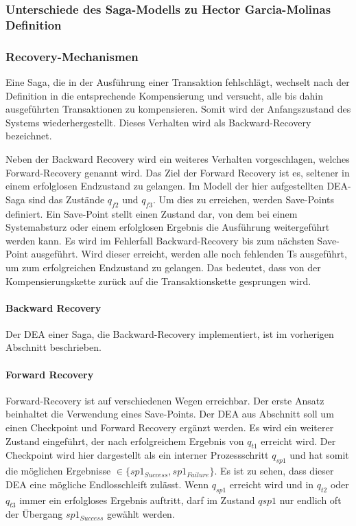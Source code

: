 \subsubsection{Unterschiede des Saga-Modells zu Hector Garcia-Molinas Definition}

\subsubsection{Recovery-Mechanismen} %
Eine Saga, die in der Ausführung einer Transaktion fehlschlägt, wechselt nach der Definition in die entsprechende Kompensierung und versucht, alle bis dahin ausgeführten Transaktionen zu kompensieren. Somit wird der Anfangszustand des Systems wiederhergestellt. Dieses Verhalten wird als Backward-Recovery bezeichnet. 

Neben der Backward Recovery wird ein weiteres Verhalten vorgeschlagen, welches Forward-Recovery genannt wird. Das Ziel der Forward Recovery ist es, seltener in einem erfolglosen Endzustand zu gelangen. Im Modell der hier aufgestellten DEA-Saga sind das Zustände $q_{f2}$ und $q_{f3}$. Um dies zu erreichen, werden Save-Points definiert. Ein Save-Point stellt einen Zustand dar, von dem bei einem Systemabsturz oder einem erfolglosen Ergebnis die Ausführung weitergeführt werden kann. Es wird im Fehlerfall Backward-Recovery bis zum nächsten Save-Point ausgeführt. Wird dieser erreicht, werden alle noch fehlenden Ts ausgeführt, um zum erfolgreichen Endzustand zu gelangen. Das bedeutet, dass von der Kompensierungskette zurück auf die Transaktionskette gesprungen wird.


\paragraph*{Backward Recovery} %
Der DEA einer Saga, die Backward-Recovery implementiert, ist im vorherigen Abschnitt beschrieben.

\paragraph*{Forward Recovery} %
Forward-Recovery ist auf verschiedenen Wegen erreichbar. Der erste Ansatz beinhaltet die Verwendung eines Save-Points. Der DEA aus Abschnitt soll um einen Checkpoint und Forward Recovery ergänzt werden. Es wird ein weiterer Zustand eingeführt, der nach erfolgreichem Ergebnis von $q_{t1}$ erreicht wird. Der Checkpoint wird hier dargestellt als ein interner Prozessschritt $q_{sp1}$ und hat somit die möglichen Ergebnisse $\in \{sp1_{Success}, sp1_{Failure}\}$. Es ist zu sehen, dass dieser DEA eine mögliche Endlosschleift zulässt. Wenn $q_{sp1}$ erreicht wird und in $q_{t2}$ oder $q_{t3}$ immer ein erfolgloses Ergebnis auftritt, darf im Zustand $qsp1$ nur endlich oft der Übergang $sp1_{Success}$ gewählt werden. 

